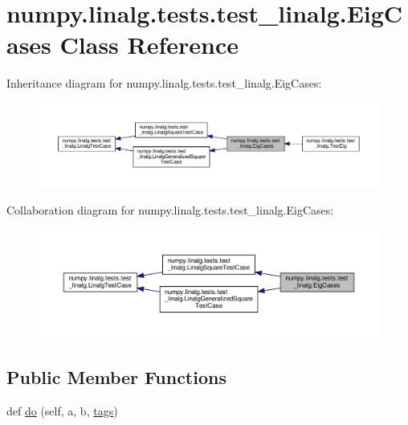 \hypertarget{classnumpy_1_1linalg_1_1tests_1_1test__linalg_1_1EigCases}{}\section{numpy.\+linalg.\+tests.\+test\+\_\+linalg.\+Eig\+Cases Class Reference}
\label{classnumpy_1_1linalg_1_1tests_1_1test__linalg_1_1EigCases}


Inheritance diagram for numpy.\+linalg.\+tests.\+test\+\_\+linalg.\+Eig\+Cases\+:
\nopagebreak
\begin{figure}[H]
\begin{center}
\leavevmode
\includegraphics[width=350pt]{classnumpy_1_1linalg_1_1tests_1_1test__linalg_1_1EigCases__inherit__graph}
\end{center}
\end{figure}


Collaboration diagram for numpy.\+linalg.\+tests.\+test\+\_\+linalg.\+Eig\+Cases\+:
\nopagebreak
\begin{figure}[H]
\begin{center}
\leavevmode
\includegraphics[width=350pt]{classnumpy_1_1linalg_1_1tests_1_1test__linalg_1_1EigCases__coll__graph}
\end{center}
\end{figure}
\subsection*{Public Member Functions}
\begin{DoxyCompactItemize}
\item 
def \hyperlink{classnumpy_1_1linalg_1_1tests_1_1test__linalg_1_1EigCases_a913f87275e4b7f3ce4183839f465f637}{do} (self, a, b, \hyperlink{namespacenumpy_1_1linalg_1_1tests_1_1test__linalg_ac6a064918e74d701a7b5aac0ffefe1e7}{tags})
\end{DoxyCompactItemize}
